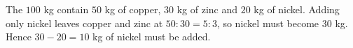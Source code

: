 The $100$ kg contain $50$ kg of copper, $30$ kg of zinc and $20$ kg of nickel. Adding only nickel leaves copper and zinc at $50:30=5:3$, so nickel must become $30$ kg. Hence $30-20=\boxed{10}$ kg of nickel must be added.
